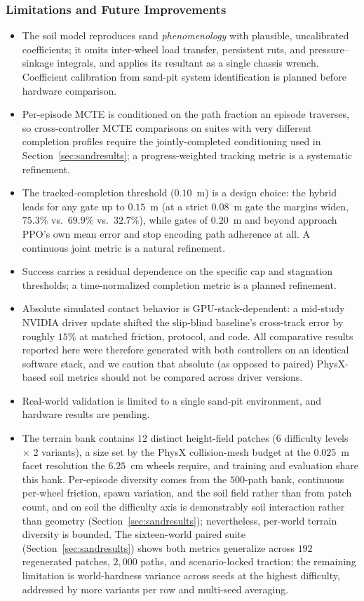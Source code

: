 \documentclass[conference]{IEEEtran}
\begin{document}
\subsubsection{Limitations and Future Improvements}
\begin{itemize}
\item The soil model reproduces sand \emph{phenomenology} with plausible, uncalibrated coefficients; it omits inter-wheel load transfer, persistent ruts, and pressure--sinkage integrals, and applies its resultant as a single chassis wrench. Coefficient calibration from sand-pit system identification is planned before hardware comparison.
\item Per-episode MCTE is conditioned on the path fraction an episode traverses, so cross-controller MCTE comparisons on suites with very different completion profiles require the jointly-completed conditioning used in Section~\ref{sec:sandresults}; a progress-weighted tracking metric is a systematic refinement.
\item The tracked-completion threshold ($0.10$~m) is a design choice: the hybrid leads for any gate up to $0.15$~m (at a strict $0.08$~m gate the margins widen, $75.3\%$ vs.\ $69.9\%$ vs.\ $32.7\%$), while gates of $0.20$~m and beyond approach PPO's own mean error and stop encoding path adherence at all. A continuous joint metric is a natural refinement.
\item Success carries a residual dependence on the specific cap and stagnation thresholds; a time-normalized completion metric is a planned refinement.
\item Absolute simulated contact behavior is GPU-stack-dependent: a mid-study NVIDIA driver update shifted the slip-blind baseline's cross-track error by roughly $15\%$ at matched friction, protocol, and code. All comparative results reported here were therefore generated with both controllers on an identical software stack, and we caution that absolute (as opposed to paired) PhysX-based soil metrics should not be compared across driver versions.
\item Real-world validation is limited to a single sand-pit environment, and hardware results are pending.
\item The terrain bank contains $12$ distinct height-field patches ($6$ difficulty levels $\times$ $2$ variants), a size set by the PhysX collision-mesh budget at the $0.025$~m facet resolution the $6.25$~cm wheels require, and training and evaluation share this bank. Per-episode diversity comes from the $500$-path bank, continuous per-wheel friction, spawn variation, and the soil field rather than from patch count, and on soil the difficulty axis is demonstrably soil interaction rather than geometry (Section~\ref{sec:sandresults}); nevertheless, per-world terrain diversity is bounded. The sixteen-world paired suite (Section~\ref{sec:sandresults}) shows both metrics generalize across $192$ regenerated patches, $2{,}000$ paths, and scenario-locked traction; the remaining limitation is world-hardness variance across seeds at the highest difficulty, addressed by more variants per row and multi-seed averaging.

\end{itemize}
\end{document}
